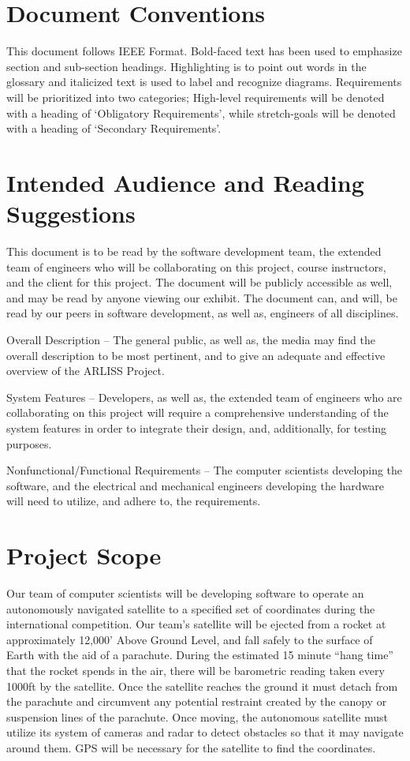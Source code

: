 \documentclass{scrreprt}
\begin{document}
\section{Document Conventions}
This document follows IEEE Format. Bold-faced text has been used to emphasize section and sub-section headings. Highlighting is to point out words in the glossary and italicized text is used to label and recognize diagrams. Requirements will be prioritized into two categories; High-level requirements will be denoted with a heading of ‘Obligatory Requirements’, while stretch-goals will be denoted with a heading of ‘Secondary Requirements’.

\section{Intended Audience and Reading Suggestions}
This document is to be read by the software development team, the extended team of engineers who will be collaborating on this project, course instructors, and the client for this project. The document will be publicly accessible as well, and may be read by anyone viewing our exhibit. The document can, and will, be read by our peers in software development, as well as, engineers of all disciplines. 

Overall Description – The general public, as well as, the media may find the overall description to be most pertinent, and to give an adequate and effective overview of the ARLISS Project.

System Features – Developers, as well as, the extended team of engineers who are collaborating on this project will require a comprehensive understanding of the system features in order to integrate their design, and, additionally, for testing purposes.

Nonfunctional/Functional Requirements – The computer scientists developing the software, and the electrical and mechanical engineers developing the hardware will need to utilize, and adhere to, the requirements.

\section{Project Scope}
Our team of computer scientists will be developing software to operate an autonomously navigated satellite to a specified set of coordinates during the international competition. Our team’s satellite will be ejected from a rocket at approximately 12,000’ Above Ground Level, and fall safely to the surface of Earth with the aid of a parachute. During the estimated 15 minute “hang time” that the rocket spends in the air, there will be barometric reading taken every 1000ft by the satellite. Once the satellite reaches the ground it must detach from the parachute and circumvent any potential restraint created by the canopy or suspension lines of the parachute. Once moving, the autonomous satellite must utilize its system of cameras and radar to detect obstacles so that it may navigate around them. GPS will be necessary for the satellite to find the coordinates.
\end{document}
